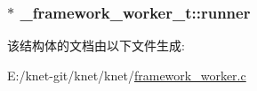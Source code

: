 \subsubsection[{runner}]{$\ast$ \+\_\+framework\+\_\+worker\+\_\+t\+::runner}\label{a00014_a815b2ce0f2ea29ae265bb7dc2e804165_a815b2ce0f2ea29ae265bb7dc2e804165}


该结构体的文档由以下文件生成\+:\begin{DoxyCompactItemize}
\item 
E\+:/knet-\/git/knet/knet/\hyperlink{a00059}{framework\+\_\+worker.\+c}\end{DoxyCompactItemize}
